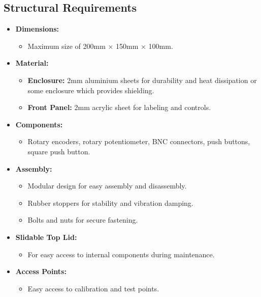 \documentclass[a4paper,12pt]{article}
\begin{document}
\subsection{Structural Requirements}
\begin{itemize}
    \item \textbf{Dimensions:}
    \begin{itemize}
        \item Maximum size of 200mm × 150mm × 100mm.
    \end{itemize}
    \item \textbf{Material:}
    \begin{itemize}
        \item \textbf{Enclosure:} 2mm aluminium sheets for durability and heat dissipation or some enclosure which provides shielding.
        \item \textbf{Front Panel:} 2mm acrylic sheet for labeling and controls.
    \end{itemize}
    \item \textbf{Components:}
    \begin{itemize}
        \item Rotary encoders, rotary potentiometer, BNC connectors, push buttons, square push button.
    \end{itemize}
    \item \textbf{Assembly:}
    \begin{itemize}
        \item Modular design for easy assembly and disassembly.
        \item Rubber stoppers for stability and vibration damping.
        \item Bolts and nuts for secure fastening.
    \end{itemize}
    \item \textbf{Slidable Top Lid:}
    \begin{itemize}
        \item For easy access to internal components during maintenance.
    \end{itemize}
    \item \textbf{Access Points:}
    \begin{itemize}
        \item Easy access to calibration and test points.
    \end{itemize}
\end{itemize}
\end{document}
